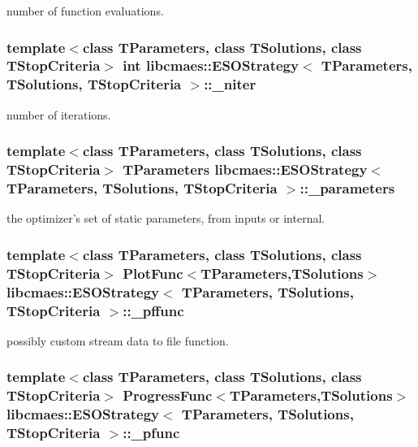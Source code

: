 number of function evaluations. \hypertarget{classlibcmaes_1_1ESOStrategy_aaf5c063558da34826ea1f976423ccfbb}{
\subsubsection[{\-\_\-niter}]{\setlength{\rightskip}{0pt plus 5cm}template$<$class T\-Parameters, class T\-Solutions, class T\-Stop\-Criteria$>$ int {\bf libcmaes\-::\-E\-S\-O\-Strategy}$<$ T\-Parameters, T\-Solutions, T\-Stop\-Criteria $>$\-::\-\_\-niter}}\label{classlibcmaes_1_1ESOStrategy_aaf5c063558da34826ea1f976423ccfbb}
number of iterations. \hypertarget{classlibcmaes_1_1ESOStrategy_a295e49238ceef8f11b3fb35296a8364a}{
\subsubsection[{\-\_\-parameters}]{\setlength{\rightskip}{0pt plus 5cm}template$<$class T\-Parameters, class T\-Solutions, class T\-Stop\-Criteria$>$ T\-Parameters {\bf libcmaes\-::\-E\-S\-O\-Strategy}$<$ T\-Parameters, T\-Solutions, T\-Stop\-Criteria $>$\-::\-\_\-parameters}}\label{classlibcmaes_1_1ESOStrategy_a295e49238ceef8f11b3fb35296a8364a}
the optimizer's set of static parameters, from inputs or internal. \hypertarget{classlibcmaes_1_1ESOStrategy_af2c9909de76f98e4b9c207bda577255d}{
\subsubsection[{\-\_\-pffunc}]{\setlength{\rightskip}{0pt plus 5cm}template$<$class T\-Parameters, class T\-Solutions, class T\-Stop\-Criteria$>$ Plot\-Func$<$T\-Parameters,T\-Solutions$>$ {\bf libcmaes\-::\-E\-S\-O\-Strategy}$<$ T\-Parameters, T\-Solutions, T\-Stop\-Criteria $>$\-::\-\_\-pffunc}}\label{classlibcmaes_1_1ESOStrategy_af2c9909de76f98e4b9c207bda577255d}
possibly custom stream data to file function. \hypertarget{classlibcmaes_1_1ESOStrategy_a25d597189596f434a2530887fddea189}{
\subsubsection[{\-\_\-pfunc}]{\setlength{\rightskip}{0pt plus 5cm}template$<$class T\-Parameters, class T\-Solutions, class T\-Stop\-Criteria$>$ Progress\-Func$<$T\-Parameters,T\-Solutions$>$ {\bf libcmaes\-::\-E\-S\-O\-Strategy}$<$ T\-Parameters, T\-Solutions, T\-Stop\-Criteria $>$\-::\-\_\-pfunc}}\label{classlibcmaes_1_1ESOStrategy_a25d597189596f434a2530887fddea189}
